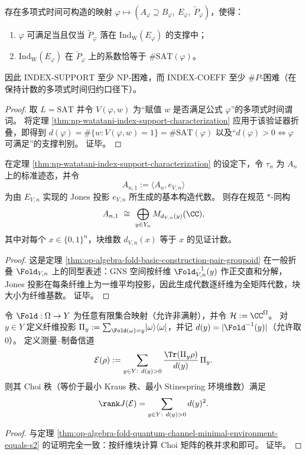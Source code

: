 \begin{corollary}\label{cor:index-support-sat-np-hard-index-coeff-sharpP}
存在多项式时间可构造的映射 \(\varphi\mapsto(A_\varphi\supseteq B_\varphi,\ E_\varphi,\ \widetilde P_\varphi)\)，使得：
\begin{enumerate}
\normalfont
  \item \(\varphi\) 可满足当且仅当 \(\widetilde P_\varphi\) 落在 \(\mathrm{Ind}_{\mathrm W}(E_\varphi)\) 的支撑中；
  \item \(\mathrm{Ind}_{\mathrm W}(E_\varphi)\) 在 \(\widetilde P_\varphi\) 上的系数恰等于 \(\#\mathrm{SAT}(\varphi)\)。
\end{enumerate}
因此 \(\mathrm{INDEX\text{-}SUPPORT}\) 至少 NP-困难，而 \(\mathrm{INDEX\text{-}COEFF}\) 至少 \(\#P\)-困难（在保持计数的多项式时间归约口径下）。
\end{corollary}
\begin{proof}
取 \(L=\mathrm{SAT}\) 并令 \(V(\varphi,w)\) 为“赋值 \(w\) 是否满足公式 \(\varphi\)”的多项式时间谓词。
将定理 \ref{thm:np-watatani-index-support-characterization} 应用于该验证器折叠，即得到
\(
d(\varphi)=\#\{w:V(\varphi,w)=1\}=\#\mathrm{SAT}(\varphi)
\)
以及“\(d(\varphi)>0\iff\varphi\) 可满足”的支撑判别。
证毕。
\end{proof}

\begin{theorem}\label{thm:np-jones-basic-construction-witness-blocks}
在定理 \ref{thm:np-watatani-index-support-characterization} 的设定下，令 \(\tau_n\) 为 \(A_n\) 上的标准迹态，并令
\[
A_{n,1}:=\langle A_n,e_{V,n}\rangle
\]
为由 \(E_{V,n}\) 实现的 Jones 投影 \(e_{V,n}\) 所生成的基本构造代数。
则存在规范 \(\ast\)-同构
\[
A_{n,1}\ \cong\ \bigoplus_{y\in Y_n} M_{d_{V,n}(y)}(\CC),
\]
其中对每个 \(x\in\{0,1\}^n\)，块维数 \(d_{V,n}(x)\) 等于 \(x\) 的见证计数。
\end{theorem}
\begin{proof}
这是定理 \ref{thm:op-algebra-fold-basic-construction-pair-groupoid} 在一般折叠 \(\Fold_{V,n}\) 上的同型表述：GNS 空间按纤维 \(\Fold_{V,n}^{-1}(y)\) 作正交直和分解，Jones 投影在每条纤维上为一维平均投影，因此生成代数逐纤维为全矩阵代数，块大小为纤维基数。
证毕。
\end{proof}

\begin{theorem}\label{thm:fold-channel-choi-rank-equals-s2-general}
令 \(\Fold:\Omega\to Y\) 为任意有限集合映射（允许非满射），并令 \(\mathcal{H}:=\CC^{\Omega}\)。
对 \(y\in Y\) 定义纤维投影 \(\Pi_y:=\sum_{\Fold(\omega)=y}\ket{\omega}\bra{\omega}\)，并记 \(d(y)=|\Fold^{-1}(y)|\)（允许取 \(0\)）。
定义测量--制备信道
\[
\mathcal E(\rho):=\sum_{y\in Y:\ d(y)>0}\frac{\Tr(\Pi_y\rho)}{d(y)}\,\Pi_y.
\]
则其 Choi 秩（等价于最小 Kraus 秩、最小 Stinespring 环境维数）满足
\[
\rank J(\mathcal E)=\sum_{y\in Y:\ d(y)>0}d(y)^2.
\]
\end{theorem}
\begin{proof}
与定理 \ref{thm:op-algebra-fold-quantum-channel-minimal-environment-equals-s2} 的证明完全一致：按纤维块计算 Choi 矩阵的秩并求和即可。
证毕。
\end{proof}

